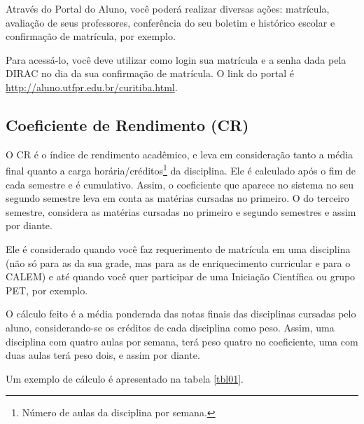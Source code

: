 \documentclass[a4paper,12pt,openany]{article}
\begin{document}
Através do Portal do Aluno, você poderá realizar diversas ações: matrícula, avaliação de seus professores, conferência do seu boletim e histórico escolar e confirmação de matrícula, por exemplo.

Para acessá-lo, você deve utilizar como login sua matrícula e a senha dada pela DIRAC no dia da sua confirmação de matrícula. O link do portal é \url{http://aluno.utfpr.edu.br/curitiba.html}.



\subsection{Coeficiente de Rendimento (CR)}

O CR é o índice de rendimento acadêmico, e leva em consideração tanto a média final quanto a carga horária/créditos\footnote{Número de aulas da disciplina por semana.} da disciplina. Ele é calculado após o fim de cada semestre e é cumulativo. Assim, o coeficiente que aparece no sistema no seu segundo semestre leva em conta as matérias cursadas no primeiro. O do terceiro semestre, considera as matérias cursadas no primeiro e segundo semestres e assim por diante.

Ele é considerado quando você faz requerimento de matrícula em uma disciplina (não só para as da sua grade, mas para as de enriquecimento curricular e para o CALEM) e até quando você quer participar de uma Iniciação Científica ou grupo PET, por exemplo.

O cálculo feito é a média ponderada das notas finais das disciplinas cursadas pelo aluno, considerando-se os créditos de cada disciplina como peso. Assim, uma disciplina com quatro aulas por semana, terá peso quatro no coeficiente, uma com duas aulas terá peso dois, e assim por diante.

Um exemplo de cálculo é apresentado na tabela \ref{tbl01}.
\end{document}
